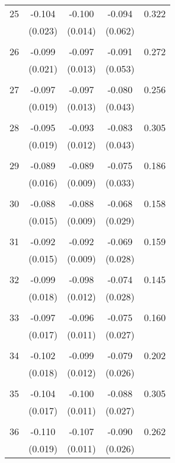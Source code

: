 \begin{tabular}{l*{1}{cccc}}
  25       & -0.104 & -0.100 & -0.094 & 0.322 \\
          & (0.023) & (0.014) & (0.062) & \\
 & & & &\\
  26       & -0.099 & -0.097 & -0.091 & 0.272 \\
          & (0.021) & (0.013) & (0.053) & \\
 & & & &\\
  27       & -0.097 & -0.097 & -0.080 & 0.256 \\
          & (0.019) & (0.013) & (0.043) & \\
 & & & &\\
  28       & -0.095 & -0.093 & -0.083 & 0.305 \\
          & (0.019) & (0.012) & (0.043) & \\
 & & & &\\
  29       & -0.089 & -0.089 & -0.075 & 0.186 \\
          & (0.016) & (0.009) & (0.033) & \\
 & & & &\\
  30       & -0.088 & -0.088 & -0.068 & 0.158 \\
          & (0.015) & (0.009) & (0.029) & \\
 & & & &\\
  31       & -0.092 & -0.092 & -0.069 & 0.159 \\
          & (0.015) & (0.009) & (0.028) & \\
 & & & &\\
  32       & -0.099 & -0.098 & -0.074 & 0.145 \\
          & (0.018) & (0.012) & (0.028) & \\
 & & & &\\
  33       & -0.097 & -0.096 & -0.075 & 0.160 \\
          & (0.017) & (0.011) & (0.027) & \\
 & & & &\\
  34       & -0.102 & -0.099 & -0.079 & 0.202 \\
          & (0.018) & (0.012) & (0.026) & \\
 & & & &\\
  35       & -0.104 & -0.100 & -0.088 & 0.305 \\
          & (0.017) & (0.011) & (0.027) & \\
 & & & &\\
  36       & -0.110 & -0.107 & -0.090 & 0.262 \\
          & (0.019) & (0.011) & (0.026) & \\

\end{tabular}
